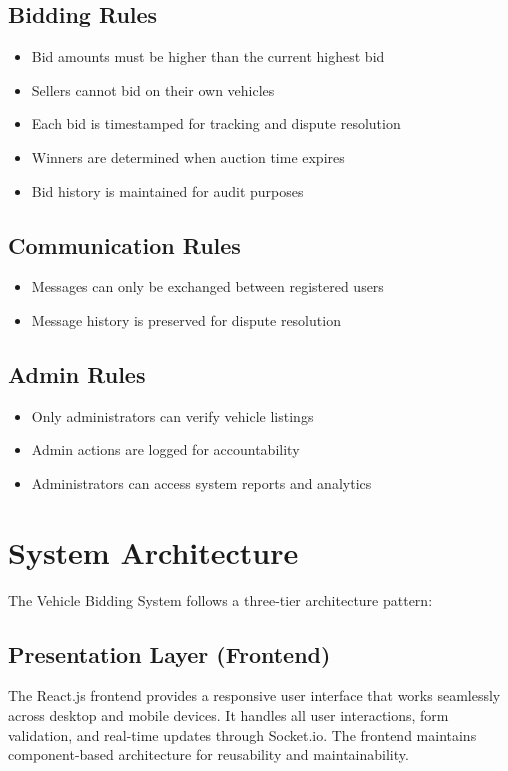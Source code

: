 \subsection{Bidding Rules}
\begin{itemize}
    \item Bid amounts must be higher than the current highest bid
    \item Sellers cannot bid on their own vehicles
    \item Each bid is timestamped for tracking and dispute resolution
    \item Winners are determined when auction time expires
    \item Bid history is maintained for audit purposes
\end{itemize}

\subsection{Communication Rules}
\begin{itemize}
    \item Messages can only be exchanged between registered users
    \item Message history is preserved for dispute resolution
\end{itemize}

\subsection{Admin Rules}
\begin{itemize}
    \item Only administrators can verify vehicle listings
    \item Admin actions are logged for accountability
    \item Administrators can access system reports and analytics
\end{itemize}

\newpage
\section{System Architecture}

The Vehicle Bidding System follows a three-tier architecture pattern:

\subsection{Presentation Layer (Frontend)}
The React.js frontend provides a responsive user interface that works seamlessly across desktop and mobile devices. It handles all user interactions, form validation, and real-time updates through Socket.io. The frontend maintains component-based architecture for reusability and maintainability.

